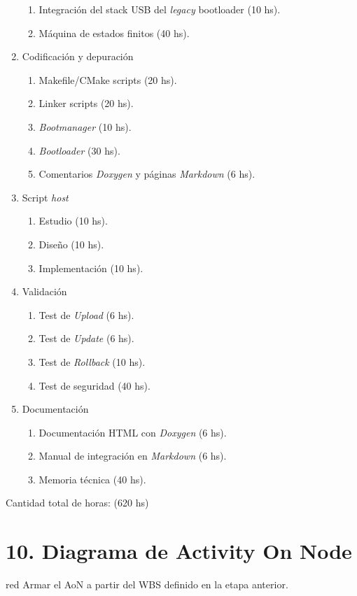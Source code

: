 \documentclass[
11pt, %
]{charter}
\begin{document}
\begin{enumerate}
\begin{enumerate}
	\item Integración del stack USB del \textit{legacy} bootloader (10 hs).
	\item Máquina de estados finitos (40 hs).
	\end{enumerate}
\item Codificación y depuración
	\begin{enumerate}
	\item Makefile/CMake scripts (20 hs).
	\item Linker scripts (20 hs).
	\item \textit{Bootmanager} (10 hs).
	\item \textit{Bootloader} (30 hs).
	\item Comentarios \textit{Doxygen} y páginas \textit{Markdown} (6 hs).
	\end{enumerate}
\item Script \textit{host}
	\begin{enumerate}
	\item Estudio (10 hs).
	\item Diseño (10 hs).
	\item Implementación (10 hs).
	\end{enumerate}
\item Validación
	\begin{enumerate}
	\item Test de \textit{Upload} (6 hs).
	\item Test de \textit{Update} (6 hs).
	\item Test de \textit{Rollback} (10 hs).
	\item Test de seguridad (40 hs).
	\end{enumerate}
\item Documentación
	\begin{enumerate}
	\item Documentación HTML con \textit{Doxygen} (6 hs).
	\item Manual de integración en \textit{Markdown} (6 hs).
	\item Memoria técnica (40 hs).
	\end{enumerate}
\end{enumerate}


Cantidad total de horas: (620 hs)

\section{10. Diagrama de Activity On Node}
\label{sec:AoN}

\begin{consigna}{red}
Armar el AoN a partir del WBS definido en la etapa anterior. 



\end{consigna}
\end{document}
